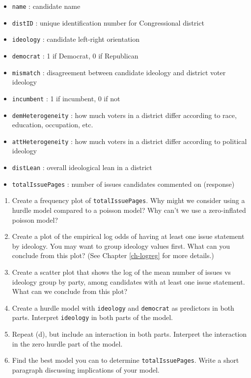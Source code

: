 \documentclass[
]{krantz}
\providecommand{\tightlist}{%
  \setlength{\itemsep}{0pt}\setlength{\parskip}{0pt}}
\begin{document}
\begin{enumerate}
  \begin{itemize}
  \tightlist
  \item
    \texttt{name} : candidate name
  \item
    \texttt{distID} : unique identification number for Congressional district
  \item
    \texttt{ideology} : candidate left-right orientation
  \item
    \texttt{democrat} : 1 if Democrat, 0 if Republican
  \item
    \texttt{mismatch} : disagreement between candidate ideology and district voter ideology
  \item
    \texttt{incumbent} : 1 if incumbent, 0 if not
  \item
    \texttt{demHeterogeneity} : how much voters in a district differ according to race, education, occupation, etc.
  \item
    \texttt{attHeterogeneity} : how much voters in a district differ according to political ideology
  \item
    \texttt{distLean} : overall ideological lean in a district
  \item
    \texttt{totalIssuePages} : number of issues candidates commented on (response)
  \end{itemize}

  \begin{enumerate}
  \def\labelenumii{\alph{enumii}.}
  \tightlist
  \item
    Create a frequency plot of \texttt{totalIssuePages}. Why might we consider using a hurdle model compared to a poisson model? Why can't we use a zero-inflated poisson model?
  \item
    Create a plot of the empirical log odds of having at least one issue statement by ideology. You may want to group ideology values first. What can you conclude from this plot? (See Chapter \ref{ch-logreg} for more details.)
  \item
    Create a scatter plot that shows the log of the mean number of issues vs ideology group by party, among candidates with at least one issue statement. What can we conclude from this plot?
  \item
    Create a hurdle model with \texttt{ideology} and \texttt{democrat} as predictors in both parts. Interpret \texttt{ideology} in both parts of the model.
  \item
    Repeat (d), but include an interaction in both parts. Interpret the interaction in the zero hurdle part of the model.
  \item
    Find the best model you can to determine \texttt{totalIssuePages}. Write a short paragraph discussing implications of your model.
  \end{enumerate}
\end{enumerate}
\end{document}
